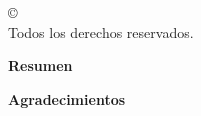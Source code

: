 



\onehalfspacing


\cleardoublepage
\thispagestyle{empty}
\begin{center}
\copyright\ \nombreautor\ \anio \\
Todos los derechos reservados.
\end{center}



\cleardoublepage
{} 
\begin{center} \Large \textbf{Resumen} \end{center}
\resumen

\cleardoublepage {}
\begin{center} \Large \textbf{Agradecimientos} \end{center}
\agradecimientos


\cleardoublepage \vspace*{1.5in}
\begin{flushright} \dedicatoria \end{flushright}


\cleardoublepage
\tableofcontents
\cleardoublepage
\listoffigures
\cleardoublepage
\listoftables
\cleardoublepage

\normalsize
{}

